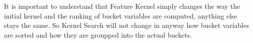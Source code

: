 It is important to understand that Feature Kernel simply changes the way the initial kernel and the ranking of bucket variables are computed, anything else stays the same. So Kernel Search
will not change in anyway how bucket variables are sorted and how they are groupped into the actual buckets. 




